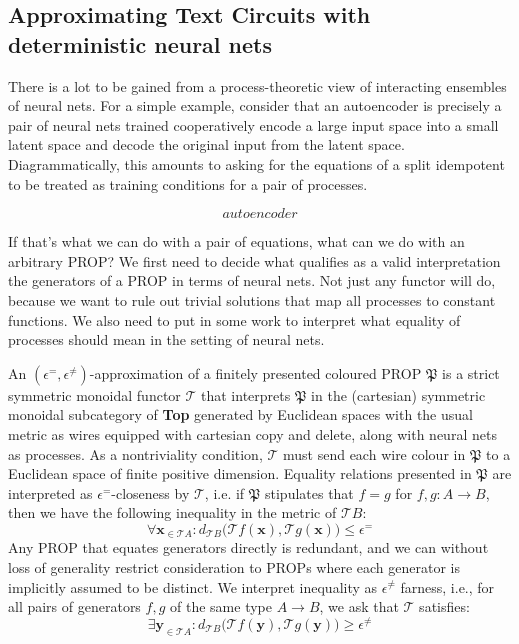 
\subsection{Approximating Text Circuits with deterministic neural nets}

There is a lot to be gained from a process-theoretic view of interacting ensembles of neural nets. For a simple example, consider that an autoencoder is precisely a pair of neural nets trained cooperatively encode a large input space into a small latent space and decode the original input from the latent space. Diagrammatically, this amounts to asking for the equations of a split idempotent to be treated as training conditions for a pair of processes.

\[autoencoder\]

If that's what we can do with a pair of equations, what can we do with an arbitrary PROP? We first need to decide what qualifies as a valid interpretation the generators of a PROP in terms of neural nets. Not just any functor will do, because we want to rule out trivial solutions that map all processes to constant functions. We also need to put in some work to interpret what equality of processes should mean in the setting of neural nets.

\begin{defn}
An $(\epsilon^{=},\epsilon^{\neq})$-approximation of a finitely presented coloured PROP $\mathfrak{P}$ is a strict symmetric monoidal functor $\mathcal{T}$ that interprets $\mathfrak{P}$ in the (cartesian) symmetric monoidal subcategory of \textbf{Top} generated by Euclidean spaces with the usual metric as wires equipped with cartesian copy and delete, along with neural nets as processes. As a nontriviality condition, $\mathcal{T}$ must send each wire colour in $\mathfrak{P}$ to a Euclidean space of finite positive dimension. Equality relations presented in $\mathfrak{P}$ are interpreted as $\epsilon^{=}$-closeness by $\mathcal{T}$, i.e. if $\mathfrak{P}$ stipulates that $f = g$ for $f,g: A \rightarrow B$, then we have the following inequality in the metric of $\mathcal{T}B$:
\[\forall \mathbf{x}_{\in\mathcal{T}A} : d_{\mathcal{T}B}\big(\mathcal{T}f(\mathbf{x}),\mathcal{T}g(\mathbf{x})\big) \leq \epsilon^{=}\]
Any PROP that equates generators directly is redundant, and we can without loss of generality restrict consideration to PROPs where each generator is implicitly assumed to be distinct. We interpret inequality as $\epsilon^{\neq}$ farness, i.e., for all pairs of generators $f,g$ of the same type $A \rightarrow B$, we ask that $\mathcal{T}$ satisfies:
\[\exists \mathbf{y}_{\in\mathcal{T}A} : d_{\mathcal{T}B}\big(\mathcal{T}f(\mathbf{y}),\mathcal{T}g(\mathbf{y})\big) \geq \epsilon^{\neq} \]
\end{defn}

